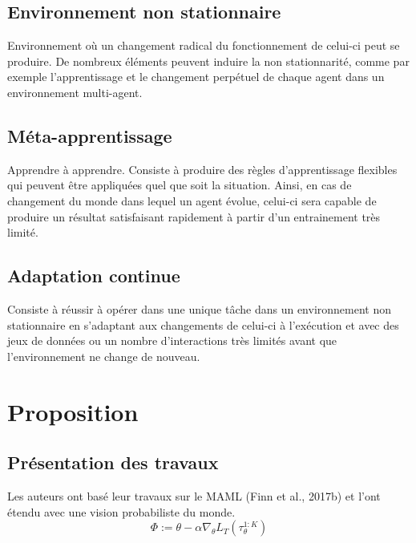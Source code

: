 \documentclass[a4paper,11pt]{article}
\begin{document}
    \subsection{Environnement non stationnaire}
    \vspace{-1em}
    Environnement où un changement radical du fonctionnement de celui-ci peut se produire. 
    De nombreux éléments peuvent induire la non stationnarité, comme par exemple l’apprentissage 
    et le changement perpétuel de chaque agent dans un environnement multi-agent.

    \subsection{Méta-apprentissage}
    \vspace{-1em}
    Apprendre à apprendre. Consiste à produire des règles d’apprentissage flexibles qui 
    peuvent être appliquées quel que soit la situation. Ainsi, en cas de changement du monde 
    dans lequel un agent évolue, celui-ci sera capable de produire un résultat satisfaisant 
    rapidement à partir d’un entrainement très limité.

    \subsection{Adaptation continue}
    \vspace{-1em}
    Consiste à réussir à opérer dans une unique tâche dans un environnement non stationnaire 
    en s’adaptant aux changements de celui-ci à l’exécution et avec des jeux de données ou un 
    nombre d’interactions très limités avant que l’environnement ne change de nouveau.

    \section{Proposition}

    \subsection{Présentation des travaux}
    \vspace{-1em}

    Les auteurs ont basé leur travaux sur le MAML (Finn et al., 2017b) et l'ont étendu 
    avec une vision probabiliste du monde.
    \begin{equation}
      \Phi := \theta - \alpha\nabla_\theta L_T(\tau_\theta^{1:K})
    \end{equation}
\end{document}
